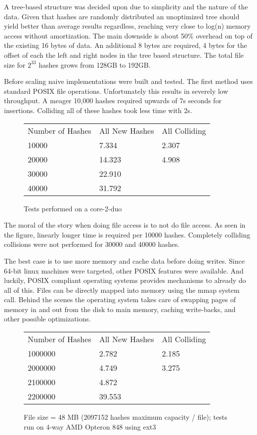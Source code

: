 A tree-based structure was decided upon due to simplicity and the nature of the data.
Given that hashes are randomly distributed an unoptimized tree should yield better than 
average results regardless, reaching very close to log(n) memory access without amortization.
The main downside is about 50\% overhead on top of the existing 16 bytes of data. An additional
8 bytes are required, 4 bytes for the offset of each the left and right nodes in the tree
based structure. The total file size for $2^{33}$ hashes grows from 128GB to 192GB.

Before scaling naive implementations were built and tested. The first method uses
standard POSIX file operations. Unfortunately this results in
severely low throughput. A meager 10,000 hashes required upwards of 7s seconds
for insertions. Colliding all of these hashes took less time with 2s. 

\begin{figure} 
        \caption{Tests performed on a core-2-duo}
\begin{tabular}{lll}
Number of Hashes    &    All New Hashes   &  All Colliding\\
10000           &        7.334          &     2.307 \\
20000           &       14.323          &     4.908\\
30000           &       22.910 & \\
40000           &       31.792 & \\
\end{tabular}
\end{figure}

The moral of the story when doing file access is to not do file access. As seen in the
figure, linearly longer time is required per 10000 hashes. Completely colliding collisions
were not performed for 30000 and 40000 hashes. 

The best case is to use more memory and cache data before doing writes. Since 64-bit linux
machines were targeted, other POSIX features were available. And luckily,
POSIX compliant operating systems provides mechanisms to already do all of this.
Files can be directly mapped into memory using the mmap system call. Behind the
scenes the operating system takes care of swapping pages of memory in and out
from the disk to main memory, caching write-backs, and other possible optimizations.


\begin{figure} 
        \caption{File size = 48 MB  (2097152 hashes maximum capacity / file); tests run on 4-way AMD Opteron 848 using ext3}
\begin{tabular}{lll}
Number of Hashes &    All New Hashes    &    All Colliding\\
1000000         &      2.782    &            2.185 \\
2000000          &     4.749     &           3.275 \\
2100000           &    4.872      &          \\
2200000            &   39.553      &         \\
\end{tabular}
\end{figure}



